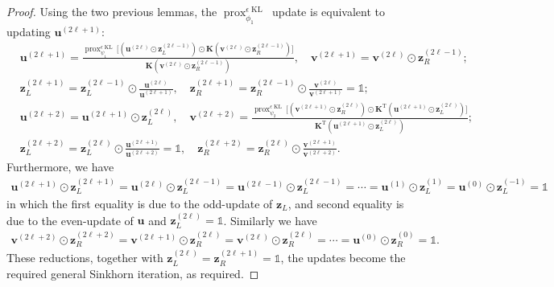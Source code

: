 \documentclass[11pt]{book}
\begin{document}
\begin{proof}
    Using the two previous lemmas, the $\operatorname{prox}_{\phi_1}^{\epsilon\operatorname{KL}}$ update is equivalent to updating $\mathbf{u}^{(2\ell+1)}$:
    \begin{align*}
        &\mathbf{u}^{(2\ell+1)} = \frac{ \operatorname{prox}_{\psi_1}^{\epsilon\operatorname{KL}}\Big[ (\mathbf{u}^{(2\ell)}\odot \mathbf{z}_{L}^{(2\ell-1)}) \odot \mathbf{K} (\mathbf{v}^{(2\ell)}\odot \mathbf{z}_{R}^{(2\ell-1)}) \Big] }{ \mathbf{K} (\mathbf{v}^{(2\ell)}\odot \mathbf{z}_{R}^{(2\ell-1)}) }, \quad \mathbf{v}^{(2\ell+1)} = \mathbf{v}^{(2\ell)}\odot \mathbf{z}_{R}^{(2\ell-1)} ;\\
        & \mathbf{z}_L^{(2\ell+1)} = \mathbf{z}_L^{(2\ell-1)} \odot \frac{\mathbf{u}^{(2\ell)}}{ \mathbf{u}^{(2\ell+1)} }, \quad 
        \mathbf{z}_R^{(2\ell+1)} = \mathbf{z}_R^{(2\ell-1)} \odot \frac{\mathbf{v}^{(2\ell)}}{ \mathbf{v}^{(2\ell+1)} } = \mathbb{1}; \\
        &\mathbf{u}^{(2\ell+2)} = \mathbf{u}^{(2\ell+1)}\odot \mathbf{z}_{L}^{(2\ell)} , \quad \mathbf{v}^{(2\ell+2)} = \frac{ \operatorname{prox}_{\psi_2}^{\epsilon\operatorname{KL}}\Big[ (\mathbf{v}^{(2\ell+1)}\odot \mathbf{z}_{R}^{(2\ell)}) \odot \mathbf{K}^{\mathrm{T}} (\mathbf{u}^{(2\ell+1)}\odot \mathbf{z}_{L}^{(2\ell)}) \Big] }{ \mathbf{K}^{\mathrm{T}} (\mathbf{u}^{(2\ell+1)}\odot \mathbf{z}_{L}^{(2\ell)}) } ; \\
        & \mathbf{z}_L^{(2\ell+2)} = \mathbf{z}_L^{(2\ell)} \odot \frac{\mathbf{u}^{(2\ell+1)}}{ \mathbf{u}^{(2\ell+2)} } = \mathbb{1}, \quad 
        \mathbf{z}_R^{(2\ell+2)} = \mathbf{z}_R^{(2\ell)} \odot \frac{\mathbf{v}^{(2\ell+1)}}{ \mathbf{v}^{(2\ell+2)} } .
    \end{align*}
    Furthermore, we have
    \begin{align*}
        \mathbf{u}^{(2\ell+1)}\odot \mathbf{z}_L^{(2\ell+1)} 
        = \mathbf{u}^{(2\ell)}\odot \mathbf{z}_L^{(2\ell-1)}
        = \mathbf{u}^{(2\ell-1)}\odot \mathbf{z}_L^{(2\ell-1)}
        = \cdots = \mathbf{u}^{(1)}\odot \mathbf{z}_L^{(1)}
        = \mathbf{u}^{(0)}\odot \mathbf{z}_L^{(-1)} = \mathbb{1}
    \end{align*}
    in which the first equality is due to the odd-update of $\mathbf{z}_L$, and second equality is due to the even-update of $\mathbf{u}$ and $\mathbf{z}_L^{(2\ell)}=\mathbb{1}$. Similarly we have
    \begin{align*}
        \mathbf{v}^{(2\ell+2)}\odot \mathbf{z}_R^{(2\ell+2)} 
        = \mathbf{v}^{(2\ell+1)}\odot \mathbf{z}_R^{(2\ell)}
        = \mathbf{v}^{(2\ell)}\odot \mathbf{z}_R^{(2\ell)}
        = \cdots 
        = \mathbf{u}^{(0)}\odot \mathbf{z}_R^{(0)} = \mathbb{1}.
    \end{align*}
    These reductions, together with $\mathbf{z}_L^{(2\ell)}= \mathbf{z}_R^{(2\ell+1)} =\mathbb{1}$, the updates become the required general Sinkhorn iteration, as required.
\end{proof}
\end{document}
